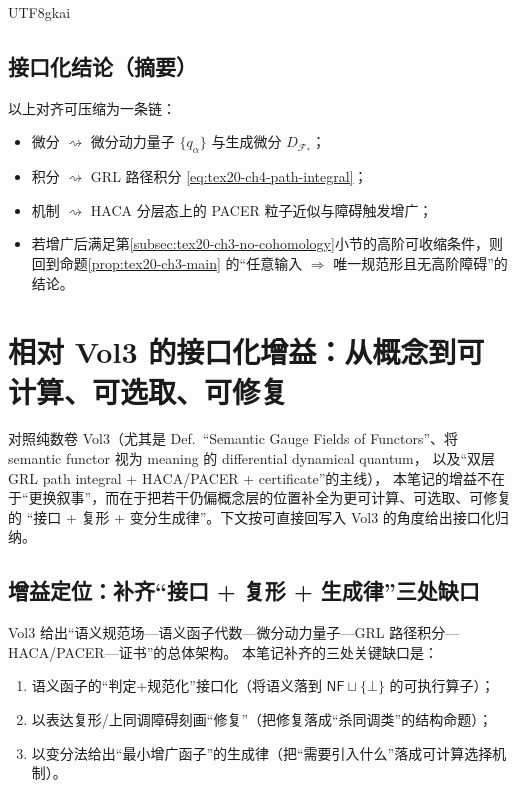 \documentclass[12pt]{article}
\begin{document}
\begin{CJK*}{UTF8}{gkai}
\subsection{接口化结论（摘要）}
\label{subsec:tex20-ch4-summary}

以上对齐可压缩为一条链：
\begin{itemize}
  \item 微分 $\rightsquigarrow$ 微分动力量子 $\{q_\alpha\}$ 与生成微分 $D_{\mathcal{F}_\ast}$；
  \item 积分 $\rightsquigarrow$ \textsf{GRL} 路径积分 \eqref{eq:tex20-ch4-path-integral}；
  \item 机制 $\rightsquigarrow$ \textsf{HACA} 分层态上的 \textsf{PACER} 粒子近似与障碍触发增广；
  \item 若增广后满足第\ref{subsec:tex20-ch3-no-cohomology}小节的高阶可收缩条件，则回到命题\ref{prop:tex20-ch3-main} 的“任意输入 $\Rightarrow$
    唯一规范形且无高阶障碍”的结论。
\end{itemize}

\section{相对 Vol3 的接口化增益：从概念到可计算、可选取、可修复}

对照纯数卷 Vol3（尤其是 Def.\ ``Semantic Gauge Fields of Functors''、将 semantic functor 视为 meaning 的 differential dynamical
  quantum，
以及“双层 \textsf{GRL} path integral + \textsf{HACA}/\textsf{PACER} + certificate”的主线），\cite{GaoZhengAppVol3}
本笔记的增益不在于“更换叙事”，而在于把若干仍偏概念层的位置补全为更可计算、可选取、可修复的
“接口 + 复形 + 变分生成律”。下文按可直接回写入 Vol3 的角度给出接口化归纳。

\subsection{增益定位：补齐“接口 + 复形 + 生成律”三处缺口}
\label{subsec:tex20-ch5-positioning}

Vol3 给出“语义规范场—语义函子代数—微分动力量子—\textsf{GRL} 路径积分—\textsf{HACA}/\textsf{PACER}—证书”的总体架构。
本笔记补齐的三处关键缺口是：
\begin{enumerate}
  \item 语义函子的“判定+规范化”接口化（将语义落到 $\mathsf{NF}\sqcup\{\bot\}$ 的可执行算子）；
  \item 以表达复形/上同调障碍刻画“修复”（把修复落成“杀同调类”的结构命题）；
  \item 以变分法给出“最小增广函子”的生成律（把“需要引入什么”落成可计算选择机制）。\cite{BV1981}
\end{enumerate}


\end{CJK*}
\end{document}

